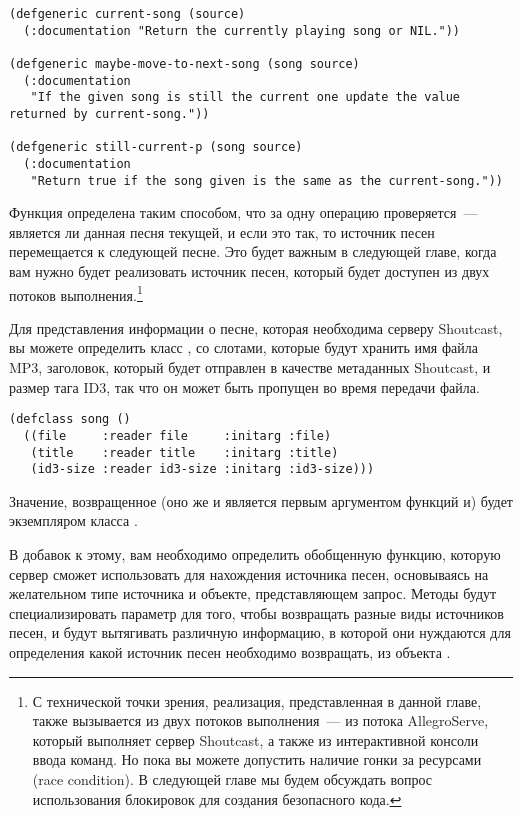 \begin{lstlisting}
(defgeneric current-song (source)
  (:documentation "Return the currently playing song or NIL."))

(defgeneric maybe-move-to-next-song (song source)
  (:documentation
   "If the given song is still the current one update the value
returned by current-song."))

(defgeneric still-current-p (song source)
  (:documentation
   "Return true if the song given is the same as the current-song."))
\end{lstlisting}

Функция  определена таким способом, что за одну операцию
проверяется~--- является ли данная песня текущей, и если это так, то источник песен
перемещается к следующей песне.  Это будет важным в следующей главе, когда вам нужно будет
реализовать источник песен, который будет доступен из двух потоков выполнения.\footnote{С
  технической точки зрения, реализация, представленная в данной главе, также вызывается из
  двух потоков выполнения~--- из потока AllegroServe, который выполняет сервер Shoutcast, а
  также из интерактивной консоли ввода команд.  Но пока вы можете допустить наличие гонки
  за ресурсами (race condition).  В следующей главе мы будем обсуждать вопрос
  использования блокировок для создания безопасного кода.}

Для представления информации о песне, которая необходима серверу Shoutcast, вы можете
определить класс , со слотами, которые будут хранить имя файла MP3, заголовок,
который будет отправлен в качестве метаданных Shoutcast, и размер тага ID3, так что он
может быть пропущен во время передачи файла.

\begin{lstlisting}
(defclass song ()
  ((file     :reader file     :initarg :file)
   (title    :reader title    :initarg :title)
   (id3-size :reader id3-size :initarg :id3-size)))
\end{lstlisting}

Значение, возвращенное  (оно же и является первым аргументом функций
 и) будет экземпляром класса
.

В добавок к этому, вам необходимо определить обобщенную функцию, которую сервер сможет
использовать для нахождения источника песен, основываясь на желательном типе источника и
объекте, представляющем запрос.  Методы будут специализировать параметр  для
того, чтобы возвращать разные виды источников песен, и будут вытягивать различную
информацию, в которой они нуждаются для определения какой источник песен необходимо
возвращать, из объекта .

